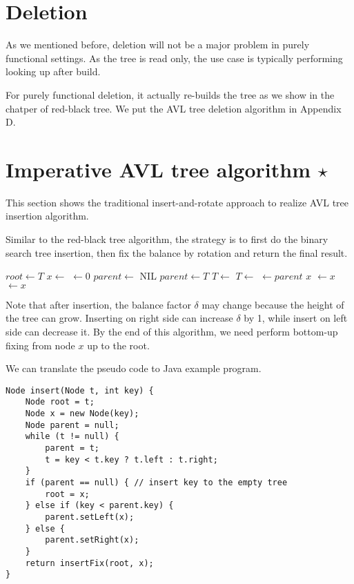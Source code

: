 \documentclass{article}
\begin{document}
\section{Deletion}

As we mentioned before, deletion will not be a major problem in
purely functional settings. As the tree is read only, the use case
is typically performing looking up after build.

For purely functional deletion, it actually re-builds the tree
as we show in the chatper of red-black tree. We put the AVL
tree deletion algorithm in Appendix D.

\section{Imperative AVL tree algorithm $\star$}

This section shows the traditional insert-and-rotate
approach to realize AVL tree insertion algorithm.

Similar to the red-black tree algorithm, the strategy
is to first do the binary search tree insertion,
then fix the balance by rotation and return the final result.

\begin{algorithmic}[1]
  \State $root \gets T$
  \State $x \gets$ 
  \State {} $\gets 0$
  \State $parent \gets$ NIL
    \State $parent \gets T$
      \State $T \gets $ 
    \Else
      \State $T \gets $ 
    \EndIf
  \EndWhile
  \State {} $\gets parent$
   
    \State \Return $x$
    \State {} $\gets x$
  \Else
    \State {} $\gets x$
  \EndIf
  \State \Return {}
\EndFunction
\end{algorithmic}

Note that after insertion, the balance factor $\delta$ may change because
the height of the tree can grow. Inserting on right side can
increase $\delta$ by 1, while insert on left side can decrease it. By
the end of this algorithm, we need perform bottom-up fixing from node $x$
up to the root.

We can translate the pseudo code to Java example program.

\lstset{language=Java}
\begin{lstlisting}
Node insert(Node t, int key) {
    Node root = t;
    Node x = new Node(key);
    Node parent = null;
    while (t != null) {
        parent = t;
        t = key < t.key ? t.left : t.right;
    }
    if (parent == null) { // insert key to the empty tree
        root = x;
    } else if (key < parent.key) {
        parent.setLeft(x);
    } else {
        parent.setRight(x);
    }
    return insertFix(root, x);
}
\end{lstlisting}
\end{document}
